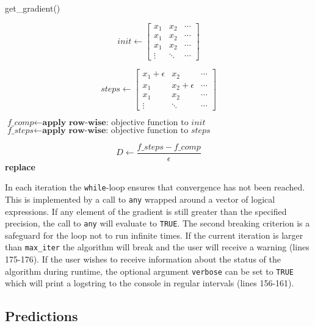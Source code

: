 \documentclass{article}
\begin{document}
\begin{algorithm}
\caption{get\_gradient()}\label{getGrad}
\begin{algorithmic}[1]
\State $$\textit{init} \gets \begin{bmatrix}
x_1 & x_2 & \cdots\\
x_1 & x_2 & \cdots\\
x_1 & x_2 & \cdots\\
\vdots & \ddots & \cdots
\end{bmatrix} $$

\State $$\textit{steps} \gets 
\begin{bmatrix}
x_1 + \epsilon & x_2 & \cdots\\
x_1 & x_2 + \epsilon & \cdots\\
x_1 & x_2 & \cdots\\
\vdots & \ddots & \cdots
\end{bmatrix}$$

\State $\textit{f\_comp} \gets \textbf{apply row-wise:} \text{ objective function to } \textit{init}$
\State $\textit{f\_steps} \gets \textbf{apply row-wise:} \text{ objective function to } \textit{steps}$
\EndProcedure

\State $$\textit{D} \gets \frac{f\_steps - f\_comp}{\epsilon}$$
 \textbf{replace} 
\EndIf
\EndProcedure
\end{algorithmic}
\end{algorithm}



In each iteration the \texttt{while}-loop ensures that convergence has not been reached. This is implemented by a call to \texttt{any} wrapped around a vector of logical expressions. If any element of the gradient is still greater than the specified precision, the call to \texttt{any} will evaluate to \texttt{TRUE}. The second breaking criterion is a safeguard for the loop not to run infinite times. If the current iteration is larger than \texttt{max\_iter} the algorithm will break and the user will receive a warning (lines 175-176). If the user wishes to receive information about the status of the algorithm during runtime, the optional argument \texttt{verbose} can be set to \texttt{TRUE} which will print a logstring to the console in regular intervals (lines 156-161).

\subsection{Predictions}
\end{document}
